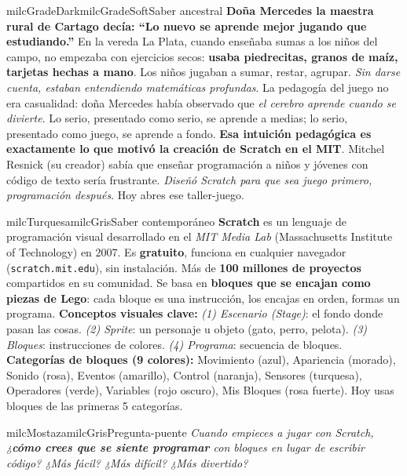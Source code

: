 \documentclass[11pt,letterpaper]{article}
\begin{document}
\begin{softbox}{milcGradeDark}{milcGradeSoft}{Saber ancestral}
\textbf{Doña Mercedes la maestra rural de Cartago decía: ``Lo nuevo se aprende mejor jugando que estudiando.''} En la vereda La Plata, cuando enseñaba sumas a los niños del campo, no empezaba con ejercicios secos: \textbf{usaba piedrecitas, granos de maíz, tarjetas hechas a mano}. Los niños jugaban a sumar, restar, agrupar. \emph{Sin darse cuenta, estaban entendiendo matemáticas profundas}. La pedagogía del juego no era casualidad: doña Mercedes había observado que \emph{el cerebro aprende cuando se divierte}. Lo serio, presentado como serio, se aprende a medias; lo serio, presentado como juego, se aprende a fondo. \textbf{Esa intuición pedagógica es exactamente lo que motivó la creación de Scratch en el MIT}. Mitchel Resnick (su creador) sabía que enseñar programación a niños y jóvenes con código de texto sería frustrante. \emph{Diseñó Scratch para que sea juego primero, programación después}. Hoy abres ese taller-juego.
\end{softbox}

\begin{softbox}{milcTurquesa}{milcGris}{Saber contemporáneo}
\textbf{Scratch} es un lenguaje de programación visual desarrollado en el \emph{MIT Media Lab} (Massachusetts Institute of Technology) en 2007. Es \textbf{gratuito}, funciona en cualquier navegador (\texttt{scratch.mit.edu}), sin instalación. Más de \textbf{100 millones de proyectos} compartidos en su comunidad. Se basa en \textbf{bloques que se encajan como piezas de Lego}: cada bloque es una instrucción, los encajas en orden, formas un programa. \textbf{Conceptos visuales clave:} \emph{(1) Escenario (Stage)}: el fondo donde pasan las cosas. \emph{(2) Sprite}: un personaje u objeto (gato, perro, pelota). \emph{(3) Bloques}: instrucciones de colores. \emph{(4) Programa}: secuencia de bloques. \textbf{Categorías de bloques (9 colores):} Movimiento (azul), Apariencia (morado), Sonido (rosa), Eventos (amarillo), Control (naranja), Sensores (turquesa), Operadores (verde), Variables (rojo oscuro), Mis Bloques (rosa fuerte). Hoy usas bloques de las primeras 5 categorías.
\end{softbox}

\begin{softbox}{milcMostaza}{milcGris}{Pregunta-puente}
\textit{Cuando empieces a jugar con Scratch, ¿\textbf{cómo crees que se siente programar} con bloques en lugar de escribir código? ¿Más fácil? ¿Más difícil? ¿Más divertido?}
\end{softbox}
\end{document}
